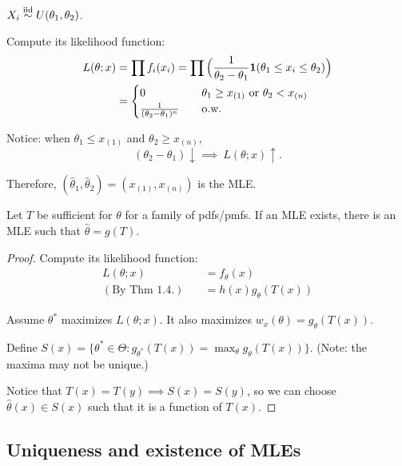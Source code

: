 \begin{exap}
	$X_i \stackrel{\text{iid}}{\sim} U(\theta_1, \theta_2)$.
	
	Compute its likelihood function:
	\begin{align*}
		L(\theta; x) & = \prod f_i(x_i) = \prod\Big(  \frac{1}{\theta_2 - \theta_1} \boldsymbol{1}(\theta_1 \leq x_i \leq \theta_2) \Big)  \\
		&= \begin{cases}
		0 &\quad \theta_1 \geq x_{(1)} \text{ or } \theta_2 < x_{(n)} \\
		\frac{1}{(\theta_2 - \theta_1)^n} &\quad \text{o.w.}
		\end{cases}
	\end{align*}
	
	Notice: when $ \theta_1 \leq x_{(1)}$ and $\theta_2 \geq x_{(n)}$,
	$$(\theta_2 - \theta_1) \downarrow \implies \ L(\theta; x) \uparrow.$$
	
	Therefore, $(\hat{\theta}_1, \hat{\theta}_2) = (x_{(1)}, x_{(n)})$ is the MLE.
\end{exap}
{
\begin{prop}
	Let $T$ be sufficient for $\theta$ for a family of pdfs/pmfs. If an MLE exists, there is an MLE such that $\hat{\theta} = g(T)$.
\end{prop}
}\begin{proof}
	Compute its likelihood function:
	\begin{align*}
		L(\theta; x) & = f_\theta (x)   \\
		(\text{By Thm 1.4.}) \quad &= h(x) g_\theta (T(x))  
	\end{align*}
	
	Assume $\theta^\ast$ maximizes $L(\theta;x)$. It also maximizes $w_x(\theta) = g_\theta (T(x))$.
	
	Define $S(x) = \{ \theta^\ast \in \Theta: g_{\theta^\ast} (T(x)) = \max_{\theta} g_\theta (T(x)) \}$. (Note: the maxima may not be unique.)
	
	Notice that $T(x) = T(y) \implies S(x) = S(y)$, so we can choose $\hat{\theta}(x) \in S(x)$ such that it is a function of $T(x)$. 
\end{proof}
 
\subsection{Uniqueness and existence of MLEs}

